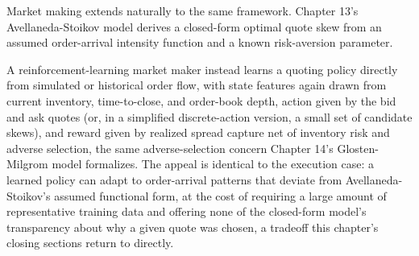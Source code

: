 \documentclass[../ai_in_finance]{subfiles}
\begin{document}
\begin{figure}[htbp]
\centering
\begin{lrbox}{\bookmeasuredbox}
\end{lrbox}
\ifdim\wd\bookmeasuredbox<0.65\linewidth
\setlength{\bookcapwidth}{0.65\linewidth}
\else
\setlength{\bookcapwidth}{\wd\bookmeasuredbox}
\fi
{}
\end{figure}

Market making extends naturally to the same framework. Chapter 13's Avellaneda-Stoikov model derives a closed-form optimal quote skew from an assumed order-arrival intensity function and a known risk-aversion parameter.

A reinforcement-learning market maker instead learns a quoting policy directly from simulated or historical order flow, with state features again drawn from current inventory, time-to-close, and order-book depth, action given by the bid and ask quotes (or, in a simplified discrete-action version, a small set of candidate skews), and reward given by realized spread capture net of inventory risk and adverse selection, the same adverse-selection concern Chapter 14's Glosten-Milgrom model formalizes. The appeal is identical to the execution case: a learned policy can adapt to order-arrival patterns that deviate from Avellaneda-Stoikov's assumed functional form, at the cost of requiring a large amount of representative training data and offering none of the closed-form model's transparency about why a given quote was chosen, a tradeoff this chapter's closing sections return to directly.
\end{document}
